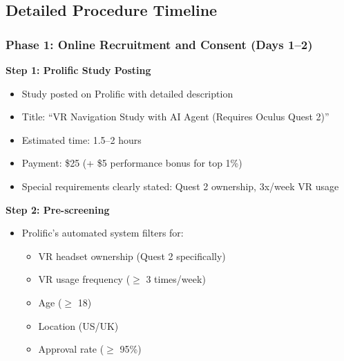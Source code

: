 \documentclass[12pt]{article}
\begin{document}
\clearpage

\subsection{Detailed Procedure Timeline}

\subsubsection{Phase 1: Online Recruitment and Consent (Days 1--2)}

\textbf{Step 1: Prolific Study Posting}
\begin{itemize}
    \item Study posted on Prolific with detailed description
    \item Title: ``VR Navigation Study with AI Agent (Requires Oculus Quest 2)''
    \item Estimated time: 1.5--2 hours
    \item Payment: \$25 (+ \$5 performance bonus for top 1\%)
    \item Special requirements clearly stated: Quest 2 ownership, 3x/week VR usage
\end{itemize}

\textbf{Step 2: Pre-screening}
\begin{itemize}
    \item Prolific's automated system filters for:
    \begin{itemize}
        \item VR headset ownership (Quest 2 specifically)
        \item VR usage frequency ($\geq$ 3 times/week)
        \item Age ($\geq$ 18)
        \item Location (US/UK)
        \item Approval rate ($\geq$ 95\%)
    \end{itemize}
\end{itemize}
\end{document}
